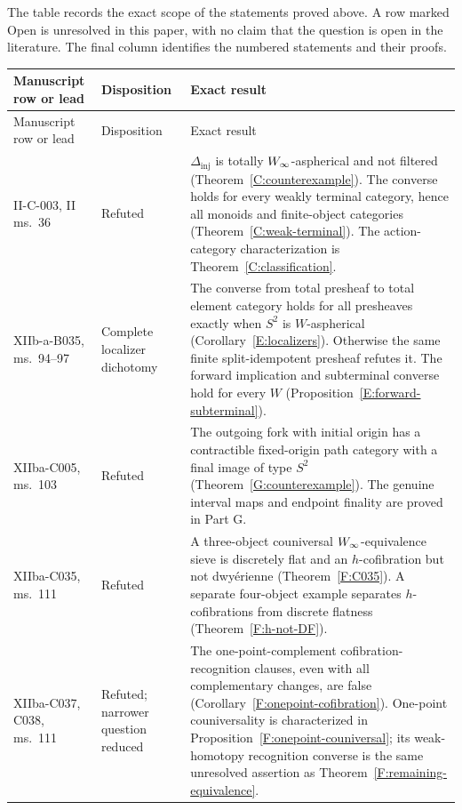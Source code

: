The table records the exact scope of the statements proved above. A row marked Open is unresolved in this paper, with no claim that the question is open in the literature. The final column identifies the numbered statements and their proofs.

\small
\begin{longtable}{@{}>{\raggedright\arraybackslash}p{}>{\raggedright\arraybackslash}p{}>{\raggedright\arraybackslash}p{}@{}}
\toprule
Manuscript row or lead & Disposition & Exact result \\
\midrule
\endfirsthead
\toprule Manuscript row or lead & Disposition & Exact result \\
\midrule
\endhead
II-C-003, II ms.~36 & Refuted & $\Delta_{\mathrm{inj}}$ is totally $W_{\infty}$-aspherical and not filtered (Theorem~\ref{C:counterexample}). The converse holds for every weakly terminal category, hence all monoids and finite-object categories (Theorem~\ref{C:weak-terminal}). The action-category characterization is Theorem~\ref{C:classification}. \\
\addlinespace
XIIb-a-B035, ms.~94--97 & Complete localizer dichotomy & The converse from total presheaf to total element category holds for all presheaves exactly when $S^2$ is $W$-aspherical (Corollary~\ref{E:localizers}). Otherwise the same finite split-idempotent presheaf refutes it. The forward implication and subterminal converse hold for every $W$ (Proposition~\ref{E:forward-subterminal}). \\
\addlinespace
XIIba-C005, ms.~103 & Refuted & The outgoing fork with initial origin has a contractible fixed-origin path category with a final image of type $S^2$ (Theorem~\ref{G:counterexample}). The genuine interval maps and endpoint finality are proved in Part G. \\
\addlinespace
XIIba-C035, ms.~111 & Refuted & A three-object couniversal $W_{\infty}$-equivalence sieve is discretely flat and an $h$-cofibration but not dwy\'erienne (Theorem~\ref{F:C035}). A separate four-object example separates $h$-cofibrations from discrete flatness (Theorem~\ref{F:h-not-DF}). \\
\addlinespace
XIIba-C037, C038, ms.~111 & Refuted; narrower question reduced & The one-point-complement cofibration-recognition clauses, even with all complementary changes, are false (Corollary~\ref{F:onepoint-cofibration}). One-point couniversality is characterized in Proposition~\ref{F:onepoint-couniversal}; its weak-homotopy recognition converse is the same unresolved assertion as Theorem~\ref{F:remaining-equivalence}. \\

\end{longtable}
